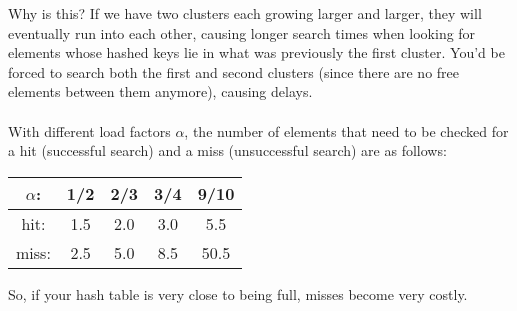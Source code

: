 \documentclass[]{article}
\theoremstyle{definition}
\begin{document}
				Why is this? If we have two clusters each growing larger and larger, they will eventually run into each other, causing longer search times when looking for elements whose hashed keys lie in what was previously the first cluster. You'd be forced to search both the first and second clusters (since there are no free elements between them anymore), causing delays.
				\\ \\
				With different load factors $\alpha$, the number of elements that need to be checked for a hit (successful search) and a miss (unsuccessful search) are as follows:
				\begin{center}
					\begin{tabular}{c|c|c|c|c}
						$\alpha$: & 1/2 & 2/3 & 3/4 & 9/10 \\ \hline
						hit: & 1.5 & 2.0 & 3.0 & 5.5 \\
						miss: & 2.5 & 5.0 & 8.5 & 50.5
					\end{tabular}
				\end{center}

				So, if your hash table is very close to being full, misses become very costly.
\end{document}
